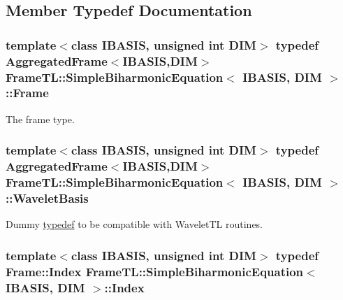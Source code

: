 \subsection{Member Typedef Documentation}
\hypertarget{classFrameTL_1_1SimpleBiharmonicEquation_b92f00909f0e7a185bcdede446570546}{
\subsubsection[Frame]{\setlength{\rightskip}{0pt plus 5cm}template$<$class IBASIS, unsigned int DIM$>$ {\bf typedef} {\bf AggregatedFrame}$<$IBASIS,DIM$>$ {\bf FrameTL::SimpleBiharmonicEquation}$<$ IBASIS, DIM $>$::{\bf Frame}}}
\label{classFrameTL_1_1SimpleBiharmonicEquation_b92f00909f0e7a185bcdede446570546}


The frame type. \hypertarget{classFrameTL_1_1SimpleBiharmonicEquation_feee9bcf85adb1115a5487773a5d8d32}{
\subsubsection[WaveletBasis]{\setlength{\rightskip}{0pt plus 5cm}template$<$class IBASIS, unsigned int DIM$>$ {\bf typedef} {\bf AggregatedFrame}$<$IBASIS,DIM$>$ {\bf FrameTL::SimpleBiharmonicEquation}$<$ IBASIS, DIM $>$::{\bf WaveletBasis}}}
\label{classFrameTL_1_1SimpleBiharmonicEquation_feee9bcf85adb1115a5487773a5d8d32}


Dummy \hyperlink{structtypedef}{typedef} to be compatible with WaveletTL routines. \hypertarget{classFrameTL_1_1SimpleBiharmonicEquation_35f42b79db1b8e156c3cdb3c22122e74}{
\subsubsection[Index]{\setlength{\rightskip}{0pt plus 5cm}template$<$class IBASIS, unsigned int DIM$>$ {\bf typedef} {\bf Frame::Index} {\bf FrameTL::SimpleBiharmonicEquation}$<$ IBASIS, DIM $>$::{\bf Index}}}
\label{classFrameTL_1_1SimpleBiharmonicEquation_35f42b79db1b8e156c3cdb3c22122e74}


